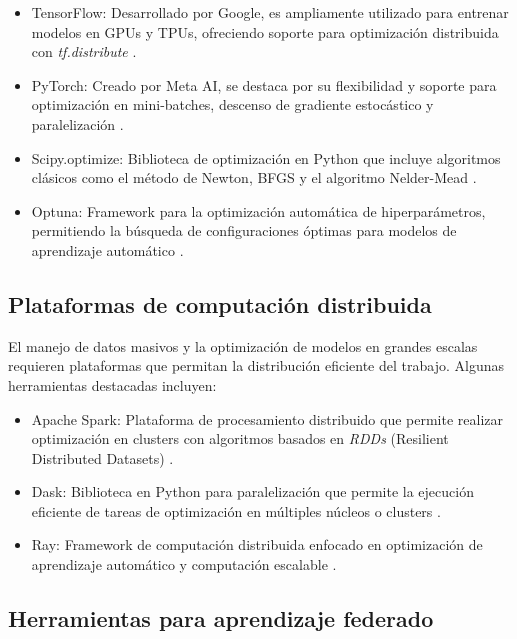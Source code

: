 \begin{itemize}
		\begin{itemize}
			\item TensorFlow: Desarrollado por Google, es ampliamente utilizado para entrenar modelos en GPUs y TPUs, ofreciendo soporte para optimización distribuida con \textit{tf.distribute} \cite{abadi2016tensorflow}.
			\item PyTorch: Creado por Meta AI, se destaca por su flexibilidad y soporte para optimización en mini-batches, descenso de gradiente estocástico y paralelización \cite{paszke2019pytorch}.
			\item Scipy.optimize: Biblioteca de optimización en Python que incluye algoritmos clásicos como el método de Newton, BFGS y el algoritmo Nelder-Mead \cite{virtanen2020scipy}.
			\item Optuna: Framework para la optimización automática de hiperparámetros, permitiendo la búsqueda de configuraciones óptimas para modelos de aprendizaje automático \cite{akiba2019optuna}.
		\end{itemize}
		
		\subsection{Plataformas de computación distribuida}
		
		El manejo de datos masivos y la optimización de modelos en grandes escalas requieren plataformas que permitan la distribución eficiente del trabajo. Algunas herramientas destacadas incluyen:
		
		\begin{itemize}
			\item Apache Spark: Plataforma de procesamiento distribuido que permite realizar optimización en clusters con algoritmos basados en \textit{RDDs} (Resilient Distributed Datasets) \cite{zaharia2010spark}.
			\item Dask: Biblioteca en Python para paralelización que permite la ejecución eficiente de tareas de optimización en múltiples núcleos o clusters \cite{rocklin2015dask}.
			\item Ray: Framework de computación distribuida enfocado en optimización de aprendizaje automático y computación escalable \cite{moritz2018ray}.
		\end{itemize}
		
		\subsection{Herramientas para aprendizaje federado}
		

\end{itemize}
